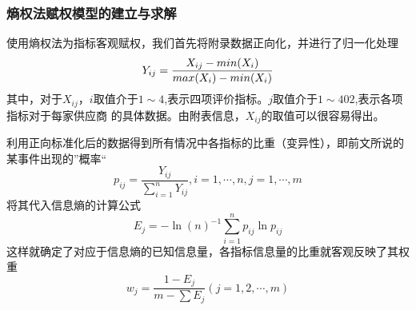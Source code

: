 \documentclass{cumcmthesis}
\begin{document}
\subsubsection*{熵权法赋权模型的建立与求解}
使用熵权法为指标客观赋权，我们首先将附录数据正向化，并进行了归一化处理
\begin{equation}
    Y_{ij}=\frac{X_{ij}-min(X_i)}{max(X_i)-min(X_i)}\large\nonumber
    \label{归一化}
\end{equation}
其中，对于$X_{ij}$，$i$取值介于$1\sim4$,表示四项评价指标。$j$取值介于$1\sim402$,表示各项指标对于每家供应商
的具体数据。由附表信息，$X_{ij}$的取值可以很容易得出。\par
利用正向标准化后的数据得到所有情况中各指标的比重（变异性），即前文所说的某事件出现的”概率“
\begin{equation}
    p_{ij}=\frac{Y_{ij}}{\sum_{i=1}^{n}{Y_{ij}}},i=1,\cdots,n,j=1,\cdots,m\nonumber
    \label{指标比重}
\end{equation}
将其代入信息熵的计算公式
\begin{equation}
    E_j = -\ln(n)^{-1}\sum_{i=1}^{n}{p_{ij}}\ln{p_{ij}}\nonumber
\end{equation}
这样就确定了对应于信息熵的已知信息量，各指标信息量的比重就客观反映了其权重
\begin{equation}
    w_j=\frac{1-E_j}{m-\sum E_j}(j=1,2,\cdots,m)
\end{equation}
\end{document}
